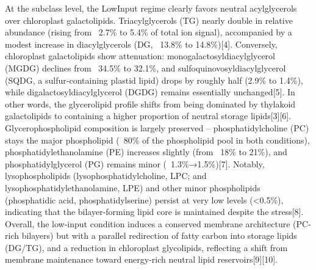 \documentclass[10pt,letterpaper]{article}
\begin{document}
\begin{itemize}
At the subclass level, the LowInput regime clearly favors neutral acylglycerols over chloroplast galactolipids. Triacylglycerols (TG) nearly double in relative abundance (rising from ~2.7\% to 5.4\% of total ion signal), accompanied by a modest increase in diacylglycerols (DG, ~13.8\% to 14.8\%)[4]. Conversely, chloroplast galactolipids show attenuation: monogalactosyldiacylglycerol (MGDG) declines from ~34.5\% to 32.1\%, and sulfoquinovosyldiacylglycerol (SQDG, a sulfur-containing plastid lipid) drops by roughly half (2.9\% to 1.4\%), while digalactosyldiacylglycerol (DGDG) remains essentially unchanged[5]. In other words, the glycerolipid profile shifts from being dominated by thylakoid galactolipids to containing a higher proportion of neutral storage lipids[3][6]. Glycerophospholipid composition is largely preserved – phosphatidylcholine (PC) stays the major phospholipid (~80\% of the phospholipid pool in both conditions), phosphatidylethanolamine (PE) increases slightly (from ~18\% to 21\%), and phosphatidylglycerol (PG) remains minor (~1.3\%→1.5\%)[7]. Notably, lysophospholipids (lysophosphatidylcholine, LPC; and lysophosphatidylethanolamine, LPE) and other minor phospholipids (phosphatidic acid, phosphatidylserine) persist at very low levels (<0.5\%), indicating that the bilayer-forming lipid core is maintained despite the stress[8]. Overall, the low-input condition induces a conserved membrane architecture (PC-rich bilayers) but with a parallel redirection of fatty carbon into storage lipids (DG/TG), and a reduction in chloroplast glycolipids, reflecting a shift from membrane maintenance toward energy-rich neutral lipid reservoirs[9][10].

\end{itemize}
\end{document}
